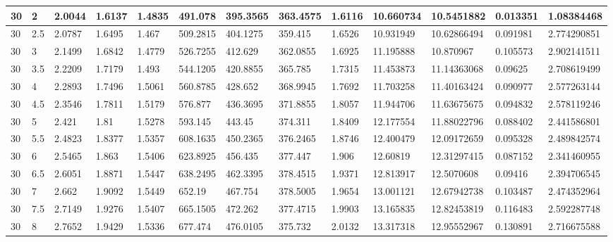 \begin{longtable}{|l|l|l|l|l|l|l|l|l|l|l|l|l|}
30    & 2     & 2.0044  & 1.6137  & 1.4835  & 491.078  & 395.3565 & 363.4575 & 1.6116   & 10.660734   & 10.5451882     & 0.013351                 & 1.08384468  \\ \hline
30    & 2.5   & 2.0787  & 1.6495  & 1.467   & 509.2815 & 404.1275 & 359.415  & 1.6526   & 10.931949   & 10.62866494    & 0.091981                 & 2.774290851 \\ \hline
30    & 3     & 2.1499  & 1.6842  & 1.4779  & 526.7255 & 412.629  & 362.0855 & 1.6925   & 11.195888   & 10.870967      & 0.105573                 & 2.902141511 \\ \hline
30    & 3.5   & 2.2209  & 1.7179  & 1.493   & 544.1205 & 420.8855 & 365.785  & 1.7315   & 11.453873   & 11.14363068    & 0.09625                  & 2.708619499 \\ \hline
30    & 4     & 2.2893  & 1.7496  & 1.5061  & 560.8785 & 428.652  & 368.9945 & 1.7692   & 11.703258   & 11.40163424    & 0.090977                 & 2.577263144 \\ \hline
30    & 4.5   & 2.3546  & 1.7811  & 1.5179  & 576.877  & 436.3695 & 371.8855 & 1.8057   & 11.944706   & 11.63675675    & 0.094832                 & 2.578119246 \\ \hline
30    & 5     & 2.421   & 1.81    & 1.5278  & 593.145  & 443.45   & 374.311  & 1.8409   & 12.177554   & 11.88022796    & 0.088402                 & 2.441586801 \\ \hline
30    & 5.5   & 2.4823  & 1.8377  & 1.5357  & 608.1635 & 450.2365 & 376.2465 & 1.8746   & 12.400479   & 12.09172659    & 0.095328                 & 2.489842574 \\ \hline
30    & 6     & 2.5465  & 1.863   & 1.5406  & 623.8925 & 456.435  & 377.447  & 1.906    & 12.60819    & 12.31297415    & 0.087152                 & 2.341460955 \\ \hline
30    & 6.5   & 2.6051  & 1.8871  & 1.5447  & 638.2495 & 462.3395 & 378.4515 & 1.9371   & 12.813917   & 12.5070608     & 0.09416                  & 2.394706545 \\ \hline
30    & 7     & 2.662   & 1.9092  & 1.5449  & 652.19   & 467.754  & 378.5005 & 1.9654   & 13.001121   & 12.67942738    & 0.103487                 & 2.474352964 \\ \hline
30    & 7.5   & 2.7149  & 1.9276  & 1.5407  & 665.1505 & 472.262  & 377.4715 & 1.9903   & 13.165835   & 12.82453819    & 0.116483                 & 2.592287748 \\ \hline
30    & 8     & 2.7652  & 1.9429  & 1.5336  & 677.474  & 476.0105 & 375.732  & 2.0132   & 13.317318   & 12.95552967    & 0.130891                 & 2.716675588 \\ \hline

\end{longtable}

